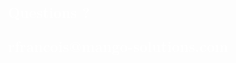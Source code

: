 \documentclass[smaller]{beamer}
\begin{document}
{
 \begin{frame}[fragile][plain]

\begin{Huge}\textcolor{white}{\sf \bfseries Questions ?}\end{Huge}

\begin{flushright}
 \begin{Large}
\textcolor{white}{\bfseries \ttfamily rfrancois@mango-solutions.com}  
 \end{Large}
\end{flushright}


 \end{frame}
}
\end{document}
